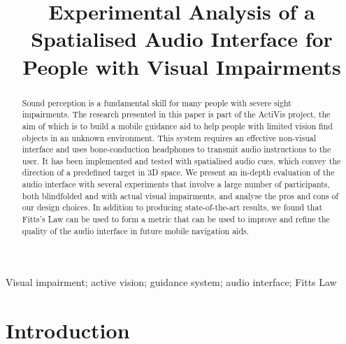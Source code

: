 \documentclass[]{interact}
\begin{document}

\title{Experimental Analysis of a Spatialised Audio Interface for People with Visual Impairments}

\author{%
}

\maketitle

\begin{abstract}
  Sound perception is a fundamental skill for many people with severe sight impairments.
  The research presented in this paper is part of the ActiVis project, the aim of which is to build a mobile guidance aid to help people with limited vision find objects in an unknown environment.
  This system requires an effective non-visual interface and uses bone-conduction headphones to transmit audio instructions to the user.
  It has been implemented and tested with spatialised audio cues, which convey the direction of a predefined target in 3D space.
  We present an in-depth evaluation of the audio interface with several experiments that involve a large number of participants, both blindfolded and with actual visual impairments, and analyse the pros and cons of our design choices.
  In addition to producing state-of-the-art results, we found that Fitts's Law can be used to form a metric that can be used to improve and refine the quality of the audio interface in future mobile navigation aids. 
\end{abstract}

\begin{keywords}
  Visual impairment; active vision; guidance system; audio interface; Fitts Law
\end{keywords}

\section{Introduction}
\end{document}
